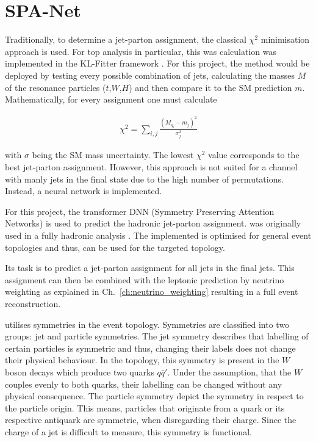 \documentclass[bachelor,ngerman,english]{GAUBM}
\begin{document}
\section{SPA-Net}
\label{sec:neural_networks:spanet}
Traditionally, to determine a jet-parton assignment, the classical $\chi^2$ minimisation approach \cite{nn:chi_squared} is used. For top analysis in particular, this was calculation was implemented in the KL-Fitter framework \cite{nn:kl_fitter}. For this project, the method would be deployed by testing every possible combination of jets, calculating the masses $M$ of the resonance particles ($t$,$W$,$H$) and then compare it to the SM prediction $m$. Mathematically, for every assignment one must calculate

\begin{align*}
    \chi^2 = \sum_{i,j} \frac{(M_{q_i}-m_j)^2}{\sigma_j^2}
\end{align*}

with $\sigma$ being the SM mass uncertainty. The lowest $\chi^2$ value corresponds to the best jet-parton assignment. However, this approach is not suited for a channel with manly jets in the final state due to the high number of permutations. Instead, a neural network is implemented.

For this project, the transformer DNN \spanet (Symmetry Preserving Attention Networks) \cite{spanet_01,spanet_02} is used to predict the hadronic jet-parton assignment. \spanet was originally used in a fully hadronic \ttbar analysis \cite{spanet_03}. The implemented is optimised for general event topologies \cite{spanet_01} and thus, can be used for the targeted \ttHWW topology.  

Its task is to predict a jet-parton assignment for all jets in the final jets. This assignment can then be combined with the leptonic prediction by neutrino weighting as explained in Ch.~\ref{ch:neutrino_weighting} resulting in a full event reconstruction.

\spanet utilises symmetries in the event topology. Symmetries are classified into two groups: jet and particle symmetries. The jet symmetry describes that labelling of certain particles is symmetric and thus, changing their labels does not change their physical behaviour. In the \ttHWW topology, this symmetry is present in the $W$ boson decays which produce two quarks $q\bar{q}'$. Under the assumption, that the $W$ couples evenly to both quarks, their labelling can be changed without any physical consequence. The particle symmetry depict the symmetry in respect to the particle origin. This means, particles that originate from a quark or its respective antiquark are symmetric, when disregarding their charge. Since the charge of a jet is difficult to measure, this symmetry is functional. 
\end{document}

